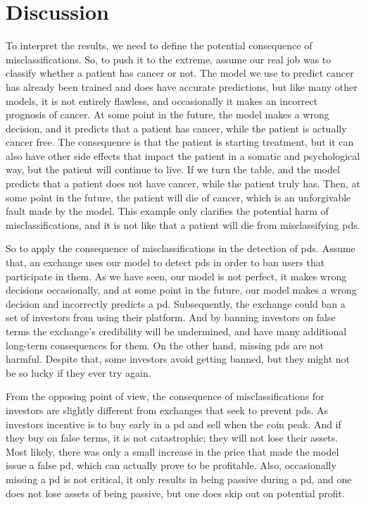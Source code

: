 \section{Discussion}
To interpret the results, we need to define the potential consequence of misclassifications. So, to push it to the extreme, assume our real job was to classify whether a patient has cancer or not. The model we use to predict cancer has already been trained and does have accurate predictions, but like many other models, it is not entirely flawless, and occasionally it makes an incorrect prognosis of cancer. At some point in the future, the model makes a wrong decision, and it predicts that a patient has cancer, while the patient is actually cancer free. The consequence is that the patient is starting treatment, but it can also have other side effects that impact the patient in a somatic and psychological way, but the patient will continue to live. If we turn the table, and the model predicts that a patient does not have cancer, while the patient truly has. Then, at some point in the future, the patient will die of cancer, which is an unforgivable fault made by the model. This example only clarifies the potential harm of misclassifications, and it is not like that a patient will die from misclassifying \acp{pd}.

So to apply the consequence of misclassifications in the detection of \acp{pd}. Assume that, an exchange uses our model to detect \acp{pd} in order to ban users that participate in them. As we have seen, our model is not perfect, it makes wrong decisions occasionally, and at some point in the future, our model makes a wrong decision and incorrectly predicts a \ac{pd}. Subsequently, the exchange could ban a set of investors from using their platform. And by banning investors on false terms the exchange's credibility will be undermined, and have many additional long-term consequences for them. On the other hand, missing \acp{pd} are not harmful. Despite that, some investors avoid getting banned, but they might not be so lucky if they ever try again.

From the opposing point of view, the consequence of misclassifications for investors are slightly different from exchanges that seek to prevent \acp{pd}. As investors incentive is to buy early in a \ac{pd} and sell when the coin peak. And if they buy on false terms, it is not catastrophic; they will not lose their assets. Most likely, there was only a small increase in the price that made the model issue a false \ac{pd}, which can actually prove to be profitable. Also, occasionally missing a \ac{pd} is not critical, it only results in being passive during a \ac{pd}, and one does not lose assets of being passive, but one does skip out on potential profit.

